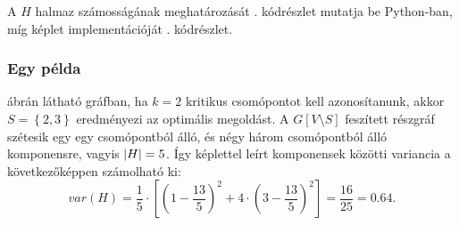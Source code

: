 A $H$ halmaz számosságának meghatározását . kódrészlet mutatja be Python-ban,
míg  képlet implementációját . kódrészlet.






\subsubsection{Egy példa}
 ábrán látható gráfban, ha $k = 2$ kritikus csomópontot kell azonosítanunk,
akkor $S = \left\{ 2, 3 \right\}$ eredményezi az optimális megoldást.
A $G\left[ V \setminus S \right]$ feszített részgráf szétesik egy egy csomópontból álló,
és négy három csomópontból álló komponensre, vagyis $\lvert H\rvert = 5$.
Így  képlettel leírt komponensek közötti variancia a következőképpen számolható ki:
\[
  var(H) = \dfrac{1}{5} \cdot \left[ \left( 1 - \dfrac{13}{5} \right)^{2} + 4 \cdot \left( 3 - \dfrac{13}{5} \right)^{2} \right] = \dfrac{16}{25} = 0.64.
\]


